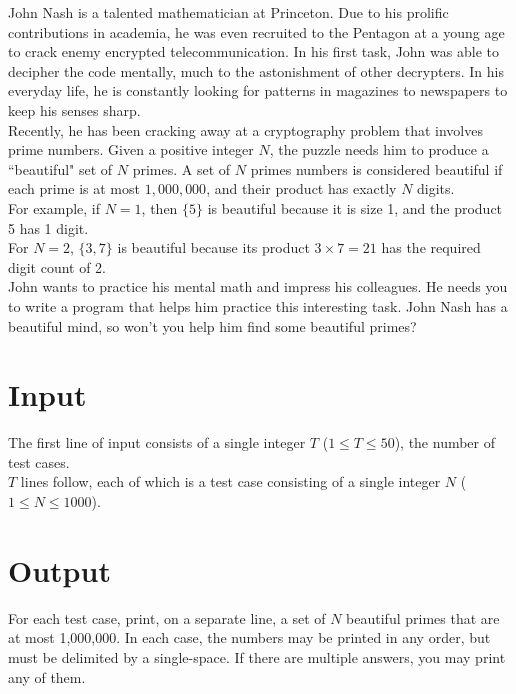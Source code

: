 
\noindent John Nash is a talented mathematician at Princeton. Due to his prolific contributions in academia, he was even recruited to the Pentagon at a young age to crack enemy encrypted telecommunication. In his first task, John was able to decipher the code mentally, much to the astonishment of other decrypters. In his everyday life, he is constantly looking for patterns in magazines to newspapers to keep his senses sharp.\\

Recently, he has been cracking away at a cryptography problem that involves prime numbers. Given a positive integer $N$, the puzzle needs him to produce a ``beautiful" set of $N$ primes. A set of $N$ primes numbers is considered beautiful if each prime is at most $1,000,000$, and their product has exactly $N$ digits.\\

For example, if $N = 1$, then $\{5\}$ is beautiful because it is size 1, and the product 5 has 1 digit.\\

For $N = 2$, $\{3, 7\}$ is beautiful because its product $3 \times 7 = 21$ has the required digit count of 2.\\

John wants to practice his mental math and impress his colleagues. He needs you to write a program that helps him practice this interesting task. John Nash has a beautiful mind, so won't you help him find some beautiful primes?

\section*{Input}
The first line of input consists of a single integer $T$ ($1 \leq T \leq 50$), the number of test cases.\\
$T$ lines follow, each of which is a test case consisting of a single integer $N$ ($1 \leq N \leq 1000$).

\section*{Output}
For each test case, print, on a separate line, a set of $N$ beautiful primes that are at most 1,000,000. In each case, the numbers may be printed in any order, but must be delimited by a single-space. If there are multiple answers, you may print any of them.
